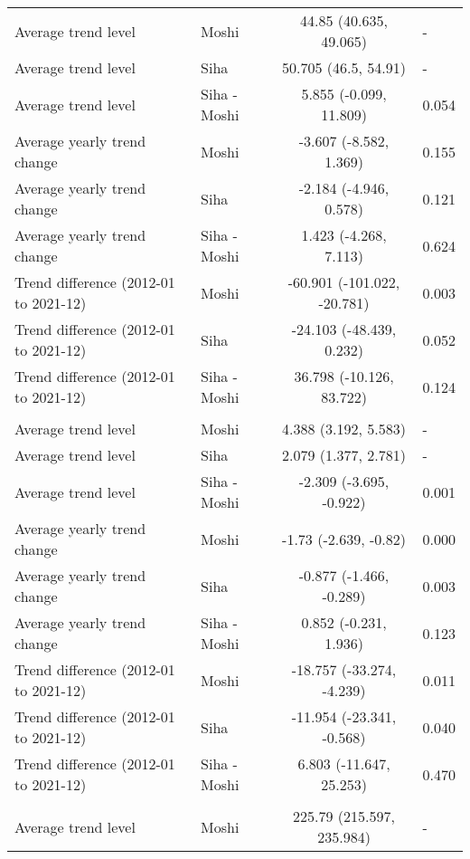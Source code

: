 \begin{longtable}{l|lcl}
\midrule\addlinespace[2.5pt]
\multicolumn{4}{l}{Road Traffic Accidents} \\ 
\midrule\addlinespace[2.5pt]
Average trend level & Moshi & 44.85 (40.635, 49.065) & - \\ 
Average trend level & Siha & 50.705 (46.5, 54.91) & - \\ 
Average trend level & Siha - Moshi & 5.855 (-0.099, 11.809) & 0.054 \\ 
Average yearly trend change & Moshi & -3.607 (-8.582, 1.369) & 0.155 \\ 
Average yearly trend change & Siha & -2.184 (-4.946, 0.578) & 0.121 \\ 
Average yearly trend change & Siha - Moshi & 1.423 (-4.268, 7.113) & 0.624 \\ 
Trend difference (2012-01 to 2021-12) & Moshi & -60.901 (-101.022, -20.781) & 0.003 \\ 
Trend difference (2012-01 to 2021-12) & Siha & -24.103 (-48.439, 0.232) & 0.052 \\ 
Trend difference (2012-01 to 2021-12) & Siha - Moshi & 36.798 (-10.126, 83.722) & 0.124 \\ 
\midrule\addlinespace[2.5pt]
\multicolumn{4}{l}{Schistosomiasis} \\ 
\midrule\addlinespace[2.5pt]
Average trend level & Moshi & 4.388 (3.192, 5.583) & - \\ 
Average trend level & Siha & 2.079 (1.377, 2.781) & - \\ 
Average trend level & Siha - Moshi & -2.309 (-3.695, -0.922) & 0.001 \\ 
Average yearly trend change & Moshi & -1.73 (-2.639, -0.82) & 0.000 \\ 
Average yearly trend change & Siha & -0.877 (-1.466, -0.289) & 0.003 \\ 
Average yearly trend change & Siha - Moshi & 0.852 (-0.231, 1.936) & 0.123 \\ 
Trend difference (2012-01 to 2021-12) & Moshi & -18.757 (-33.274, -4.239) & 0.011 \\ 
Trend difference (2012-01 to 2021-12) & Siha & -11.954 (-23.341, -0.568) & 0.040 \\ 
Trend difference (2012-01 to 2021-12) & Siha - Moshi & 6.803 (-11.647, 25.253) & 0.470 \\ 
\midrule\addlinespace[2.5pt]
\multicolumn{4}{l}{Skin Infection - Fungal} \\ 
\midrule\addlinespace[2.5pt]
Average trend level & Moshi & 225.79 (215.597, 235.984) & - \\ 

\end{longtable}
